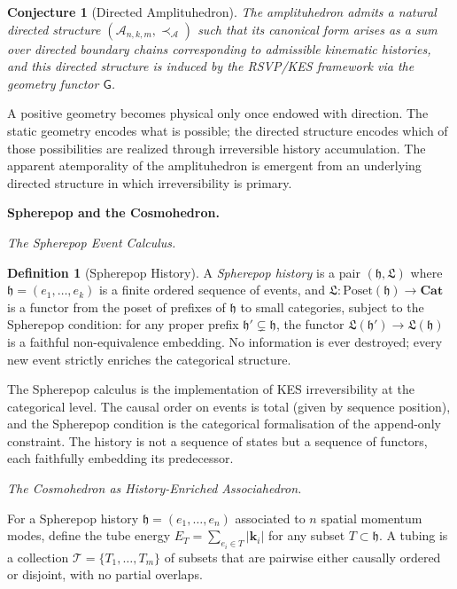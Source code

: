 \documentclass[12pt, oneside]{amsart}
\theoremstyle{plain}
\newtheorem{conjecture}[theorem]{Conjecture}
\theoremstyle{definition}
\newtheorem{definition}[theorem]{Definition}
\theoremstyle{remark}
\newcommand{\hist}{\mathfrak{h}}
\newcommand{\Log}{\mathfrak{L}}
\newcommand{\Gfun}{\mathsf{G}}
\begin{document}
\begin{conjecture}[Directed Amplituhedron]
\label{conj:directed-amplituhedron}
The amplituhedron admits a natural directed structure $(\mathcal{A}_{n,k,m}, \prec_{\mathcal{A}})$ such that its canonical form arises as a sum over directed boundary chains corresponding to admissible kinematic histories, and this directed structure is induced by the RSVP/KES framework via the geometry functor $\Gfun$.
\end{conjecture}

A positive geometry becomes physical only once endowed with direction. The static geometry encodes what is possible; the directed structure encodes which of those possibilities are realized through irreversible history accumulation. The apparent atemporality of the amplituhedron is emergent from an underlying directed structure in which irreversibility is primary.

\bigskip\noindent\textbf{Spherepop and the Cosmohedron.}
\label{sec:spherepop}

\medskip\noindent\textit{The Spherepop Event Calculus.}

\begin{definition}[Spherepop History]
A \emph{Spherepop history} is a pair $(\hist, \Log)$ where $\hist = (e_1, \ldots, e_k)$ is a finite ordered sequence of events, and $\Log: \mathrm{Poset}(\hist) \to \mathbf{Cat}$ is a functor from the poset of prefixes of $\hist$ to small categories, subject to the Spherepop condition: for any proper prefix $\hist' \subsetneq \hist$, the functor $\Log(\hist') \to \Log(\hist)$ is a faithful non-equivalence embedding. No information is ever destroyed; every new event strictly enriches the categorical structure.
\end{definition}

The Spherepop calculus is the implementation of KES irreversibility at the categorical level. The causal order on events is total (given by sequence position), and the Spherepop condition is the categorical formalisation of the append-only constraint. The history is not a sequence of states but a sequence of functors, each faithfully embedding its predecessor.

\medskip\noindent\textit{The Cosmohedron as History-Enriched Associahedron.}

For a Spherepop history $\hist = (e_1, \ldots, e_n)$ associated to $n$ spatial momentum modes, define the tube energy $E_T = \sum_{e_i \in T} |\mathbf{k}_i|$ for any subset $T \subset \hist$. A tubing is a collection $\mathcal{T} = \{T_1, \ldots, T_m\}$ of subsets that are pairwise either causally ordered or disjoint, with no partial overlaps.
\end{document}
